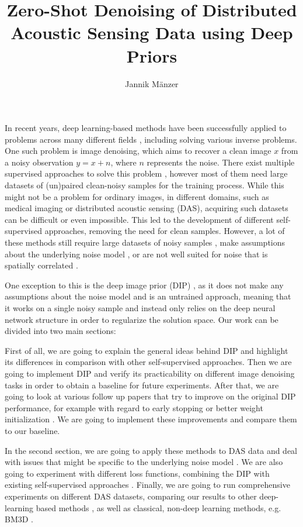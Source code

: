\documentclass[a4paper, 12pt]{article}
\title{\textbf{Zero-Shot Denoising of Distributed Acoustic Sensing Data using Deep Priors}}
\author{Jannik Mänzer}
\date{}
\begin{document}
\maketitle

In recent years, deep learning-based methods have been successfully applied to problems across many different fields
\cite{ImageNet, GAN, GPT3}, including solving various inverse problems. One such problem is image denoising, which aims
to recover a clean image $x$ from a noisy observation $y = x + n$, where $n$ represents the noise. There exist multiple
supervised approaches to solve this problem \cite{DnCNN, GCBD}, however most of them need large datasets of (un)paired
clean-noisy samples for the training process. While this might not be a problem for ordinary images, in different
domains, such as medical imaging or distributed acoustic sensing (DAS), acquiring such datasets can be difficult or even
impossible. This led to the development of different self-supervised approaches, removing the need for clean samples.
However, a lot of these methods still require large datasets of noisy samples \cite{Noise2Noise}, make assumptions about
the underlying noise model \cite{Noisier2Noise}, or are not well suited for noise that is spatially correlated
\cite{Noise2Self}.

One exception to this is the deep image prior (DIP) \cite{DIP}, as it does not make any assumptions about the noise
model and is an untrained approach, meaning that it works on a single noisy sample and instead only relies on the deep
neural network structure in order to regularize the solution space. Our work can be divided into two main sections:

First of all, we are going to explain the general ideas behind DIP and highlight its differences in comparison with
other self-supervised approaches. Then we are going to implement DIP and verify its practicability on different image
denoising tasks in order to obtain a baseline for future experiments. After that, we are going to look at various follow
up papers that try to improve on the original DIP performance, for example with regard to early stopping
\cite{EarlyStopping, RethinkingDIP} or better weight initialization \cite{MetaDIP, EDIP}. We are going to implement
these improvements and compare them to our baseline.

In the second section, we are going to apply these methods to DAS data and deal with issues that might be specific to
the underlying noise model \cite{SelfMixed}. We are also going to experiment with different loss functions, combining
the DIP with existing self-supervised approaches \cite{DDIP, Noise2Self, Noise2Same}. Finally, we are going to run
comprehensive experiments on different DAS datasets, comparing our results to other deep-learning based methods
\cite{DAS-N2N, DAS-J-invariant, SelfMixed}, as well as classical, non-deep learning methods, e.g. BM3D \cite{BM3D}.

\printbibliography
\end{document}
